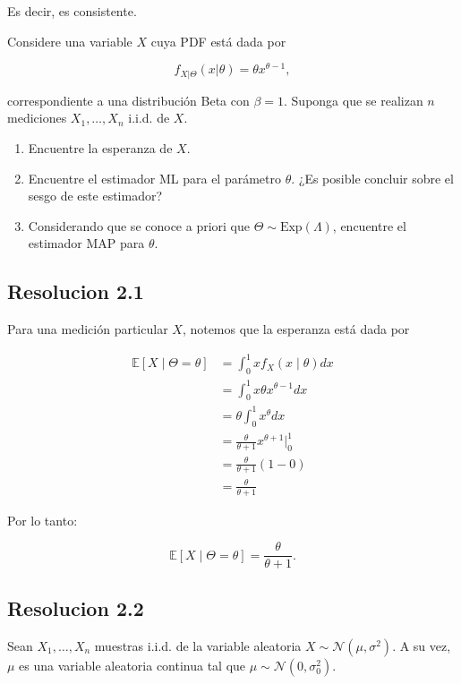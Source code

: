 \documentclass[
  11pt,
  letterpaper,
   addpoints,
  ]{exam}
\begin{document}
\begin{questions}
\begin{solution}
Es decir, es consistente.
    \end{solution}
    \question Considere una variable \(X\) cuya PDF está dada por

    \[
    f_{X|\Theta}(x|\theta) = \theta x^{\theta - 1}, \tag{1}
    \]
    
    correspondiente a una distribución Beta con \(\beta = 1\). Suponga que se realizan \(n\) mediciones \(X_1, \ldots, X_n\) i.i.d. de \(X\).
    
    \begin{enumerate}
        \item Encuentre la esperanza de \(X\).
        \item Encuentre el estimador ML para el parámetro \(\theta\). ¿Es posible concluir sobre el sesgo de este estimador?
        \item Considerando que se conoce a priori que \(\Theta \sim \text{Exp}(\Lambda)\), encuentre el estimador MAP para \(\theta\).
    \end{enumerate}
\begin{solution}
    \subsection*{Resolucion 2.1}
    Para una medición particular $X$, notemos que la esperanza está dada por

\begin{align}
\mathbb{E}[X \mid \Theta = \theta] &= \int_0^1 x f_X(x \mid \theta) dx \tag{2} \\
&= \int_0^1 x \theta x^{\theta - 1} dx \tag{3} \\
&= \theta \int_0^1 x^\theta dx \tag{4} \\
&= \frac{\theta}{\theta + 1} x^{\theta + 1} \Big|_0^1 \tag{5} \\
&= \frac{\theta}{\theta + 1} (1 - 0) \tag{6} \\
&= \frac{\theta}{\theta + 1} \tag{7}
\end{align}

Por lo tanto:

\[
\mathbb{E}[X \mid \Theta = \theta] = \frac{\theta}{\theta + 1}. \tag{8}
\]
\subsection*{Resolucion 2.2}
\end{solution}
\question Sean \( X_1, \ldots, X_n \) muestras i.i.d. de la variable aleatoria \( X \sim \mathcal{N}(\mu, \sigma^2) \). A su vez, \(\mu\) es una variable aleatoria continua tal que \( \mu \sim \mathcal{N}(0, \sigma_0^2) \).


\end{questions}
\end{document}
